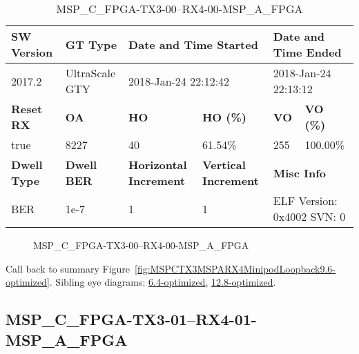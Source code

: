 \begin{table}[h]
\centering
\caption{MSP\_C\_FPGA-TX3-00--RX4-00-MSP\_A\_FPGA}
\label{tab:MSPCFPGATX300RX400MSPAFPGA9.6-optimized}
\begin{tabular}{@{}|l|l|l|l|l|l|@{}}
\toprule
\textbf{SW Version}                & \textbf{GT Type}   & \multicolumn{2}{l|}{\textbf{Date and Time Started}}            & \multicolumn{2}{l|}{\textbf{Date and Time Ended}}        \\ \midrule
2017.2                       & UltraScale GTY          & \multicolumn{2}{l|}{2018-Jan-24 22:12:42}                   & \multicolumn{2}{l|}{2018-Jan-24 22:13:12}               \\ \midrule
\textbf{Reset RX}                  & \textbf{OA} & \textbf{HO}   & \textbf{HO (\%)} & \textbf{VO} & \textbf{VO (\%)} \\ \midrule
true & 8227        & 40          & 61.54\%        & 255        & 100.00\%       \\ \midrule
\textbf{Dwell Type}                & \textbf{Dwell BER} & \textbf{Horizontal Increment} & \textbf{Vertical Increment}    & \multicolumn{2}{l|}{\textbf{Misc Info}}                  \\ \midrule
BER                            & 1e-7        & 1        & 1           & \multicolumn{2}{l|}{ELF Version: 0x4002 SVN: 0}                         \\ \bottomrule
\end{tabular}
\end{table}

\begin{figure}[h]
\caption{MSP\_C\_FPGA-TX3-00--RX4-00-MSP\_A\_FPGA} \label{fig:MSPCFPGATX300RX400MSPAFPGA9.6-optimized}
\end{figure}

Call back to summary Figure~\ref{fig:MSPCTX3MSPARX4MinipodLoopback9.6-optimized}.
Sibling eye diagrams: \hyperref[sec:MSPCFPGATX300RX400MSPAFPGA6.4-optimized]{6.4-optimized}, \hyperref[sec:MSPCFPGATX300RX400MSPAFPGA12.8-optimized]{12.8-optimized}.

\clearpage
\newpage


\subsection{MSP\_C\_FPGA-TX3-01--RX4-01-MSP\_A\_FPGA}\label{sec:MSPCFPGATX301RX401MSPAFPGA9.6-optimized}

